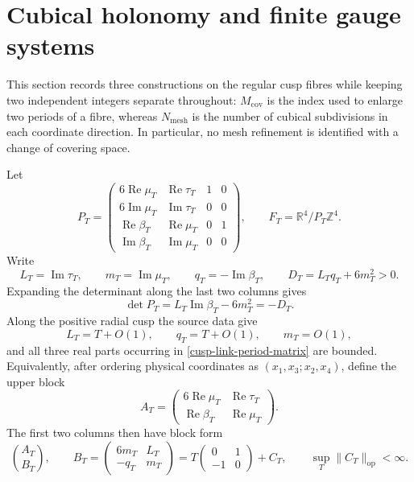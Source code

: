 \documentclass[11pt]{article}
\theoremstyle{definition}
\numberwithin{equation}{section}
\begin{document}
\section{Cubical holonomy and finite gauge systems}
\label{cusp-link-section}

This section records three constructions on the regular cusp fibres while
keeping two independent integers separate throughout:
\(M_{\mathrm{cov}}\) is the index used to enlarge two periods of a fibre,
whereas \(N_{\mathrm{mesh}}\) is the number of cubical subdivisions in each
coordinate direction.  In particular, no mesh refinement is identified with
a change of covering space.

Let
\begin{equation}
 P_T=
 \begin{pmatrix}
  6\operatorname{Re}\mu_T&\operatorname{Re}\tau_T&1&0\\
  6\operatorname{Im}\mu_T&\operatorname{Im}\tau_T&0&0\\
  \operatorname{Re}\beta_T&\operatorname{Re}\mu_T&0&1\\
  \operatorname{Im}\beta_T&\operatorname{Im}\mu_T&0&0
 \end{pmatrix},
 \qquad
 F_T=\mathbb R^4/P_T\mathbb Z^4.
 \label{cusp-link-period-matrix}
\end{equation}
Write
\begin{equation}
 L_T=\operatorname{Im}\tau_T,
 \qquad m_T=\operatorname{Im}\mu_T,
 \qquad q_T=-\operatorname{Im}\beta_T,
 \qquad D_T=L_Tq_T+6m_T^2>0.
 \label{cusp-link-radial-data}
\end{equation}
Expanding the determinant along the last two columns gives
\[
 \det P_T=L_T\operatorname{Im}\beta_T-6m_T^2=-D_T.
\]
Along the positive radial cusp the source data give
\begin{equation}
 L_T=T+O(1),\qquad q_T=T+O(1),\qquad m_T=O(1),
 \label{cusp-link-cusp-asymptotics}
\end{equation}
and all three real parts occurring in \eqref{cusp-link-period-matrix} are
bounded.  Equivalently, after ordering physical coordinates as
\((x_1,x_3;x_2,x_4)\), define the upper block
\[
 A_T=
 \begin{pmatrix}
  6\operatorname{Re}\mu_T&\operatorname{Re}\tau_T\\
  \operatorname{Re}\beta_T&\operatorname{Re}\mu_T
 \end{pmatrix}.
\]
The first two columns then have block form
\begin{equation}
 \binom{A_T}{B_T},\qquad
 B_T=
 \begin{pmatrix}6m_T&L_T\\-q_T&m_T\end{pmatrix}
 =T\begin{pmatrix}0&1\\-1&0\end{pmatrix}+C_T,
 \qquad \sup_T\lVert C_T\rVert_{\mathrm{op}}<\infty.
 \label{cusp-link-block-form}
\end{equation}
\end{document}
